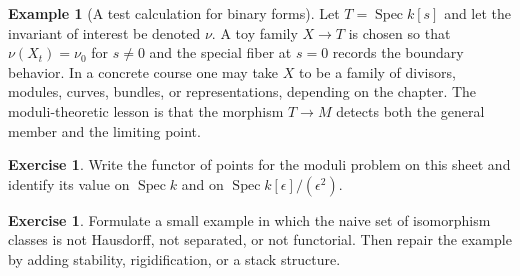 \documentclass[11pt]{amsart}
\theoremstyle{definition}
\newtheorem{example}[theorem]{Example}
\newtheorem{exercise}[theorem]{Exercise}
\newcommand{\Spec}{\operatorname{Spec}}
\begin{document}
\begin{example}[A test calculation for binary forms]
Let $T=\Spec k[s]$ and let the invariant of interest be denoted $\nu$.  A toy family $X\to T$ is chosen so that $\nu(X_t)=\nu_0$ for $s\ne0$ and the special fiber at $s=0$ records the boundary behavior.  In a concrete course one may take $X$ to be a family of divisors, modules, curves, bundles, or representations, depending on the chapter.  The moduli-theoretic lesson is that the morphism $T\to M$ detects both the general member and the limiting point.
\end{example}
\begin{exercise}
Write the functor of points for the moduli problem on this sheet and identify its value on $\Spec k$ and on $\Spec k[\epsilon]/(\epsilon^2)$.
\end{exercise}
\begin{exercise}
Formulate a small example in which the naive set of isomorphism classes is not Hausdorff, not separated, or not functorial.  Then repair the example by adding stability, rigidification, or a stack structure.
\end{exercise}
\clearpage
\end{document}
